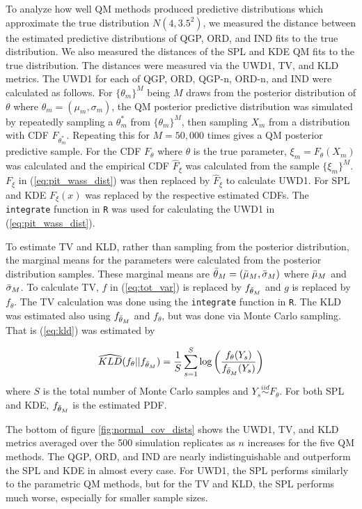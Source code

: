 To analyze how well QM methods produced predictive distributions which 
approximate the true distribution $N(4, 3.5^2)$, we measured the distance 
between the estimated predictive distributions of QGP, ORD, and IND fits to 
the true distribution. 
We also measured the distances of the SPL and KDE QM fits to the true 
distribution. The distances were measured via the UWD1, TV, and KLD metrics. 
The UWD1 for each of QGP, ORD, QGP-n, ORD-n, and IND were calculated as 
follows. For $\{\theta_m\}^M$ being $M$ draws from the posterior distribution
of $\theta$ where $\theta_m = (\mu_m, \sigma_m)$, the QM posterior predictive 
distribution was simulated by repeatedly sampling a $\theta_m^*$ from 
$\{\theta_m\}^M$, then sampling 
$X_m$ from a distribution with CDF $F_{\theta_m^*}$. Repeating this for 
$M = 50,000$ times gives a QM posterior predictive sample. For the CDF 
$F_{\theta}$ where $\theta$ is the true parameter, $\xi_m = F_{\theta}(X_m)$ 
was calculated and the empirical CDF $\hat{F}_{\xi}$ was calculated from the 
sample $\{\xi_m\}^M$. $F_{\xi}$ in (\ref{eq:pit_wass_dist}) was then replaced 
by $\hat{F}_{\xi}$ to calculate UWD1. For SPL and KDE $F_{\xi}(x)$ was replaced 
by the respective estimated CDFs. The \texttt{integrate} function in \texttt{R} 
was used for calculating the UWD1 in (\ref{eq:pit_wass_dist}).

To estimate TV and KLD, rather than sampling from the posterior distribution, 
the marginal means for the parameters were calculated from the posterior 
distribution samples. These marginal means  are 
$\Bar{\theta}_M = (\Bar{\mu}_M, \Bar{\sigma}_M)$ where $\Bar{\mu}_M$ and 
$\Bar{\sigma}_M$. To calculate TV, 
$f$ in (\ref{eq:tot_var}) is replaced by $f_{\Bar{\theta}_M}$ and $g$ is 
replaced by $f_{\theta}$. The TV calculation was done using the 
\texttt{integrate} function in \texttt{R}. The KLD was estimated also using 
$f_{\Bar{\theta}_M}$ and $f_{\theta}$, but was done via Monte Carlo sampling. 
That is (\ref{eq:kld}) was estimated by

\[
    \widehat{KLD}(f_{\theta} || f_{\Bar{\theta}_M}) = 
    \frac{1}{S}\sum_{s = 1}^S \text{log} 
    \left(\frac{f_{\theta}(Y_s)}{f_{\Bar{\theta}_M}(Y_s)}\right)
\]
where $S$ is the total number of Monte Carlo samples and
$Y_s \overset{iid}{\sim} F_{\theta}$. For both SPL and KDE, 
$f_{\Bar{\theta}_M}$ is the estimated PDF.


The bottom of figure \ref{fig:normal_cov_dists} shows the UWD1, TV, and 
KLD metrics averaged over the 500 simulation replicates as $n$ increases for 
the five QM methods. The QGP, ORD, and IND are nearly indistinguishable and 
outperform the SPL and KDE in almost every case. 
For UWD1, the SPL performs similarly to the parametric QM methods, but for the 
TV and KLD, the SPL performs much worse, especially for smaller sample sizes. 

